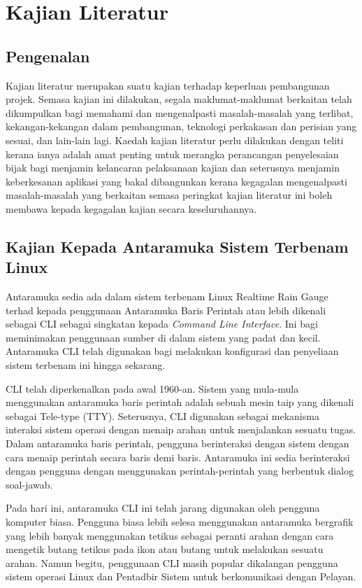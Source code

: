 \chapter{Kajian Literatur}\label{c2}%

\section{Pengenalan}
Kajian literatur merupakan suatu kajian terhadap keperluan pembangunan projek. Semasa kajian ini dilakukan, segala maklumat-maklumat berkaitan telah dikumpulkan bagi memahami dan mengenalpasti masalah-masalah yang terlibat, kekangan-kekangan dalam pembangunan, teknologi perkakasan dan perisian yang sesuai, dan lain-lain lagi. Kaedah kajian literatur perlu dilakukan dengan teliti kerana ianya adalah amat penting untuk merangka
perancangan penyelesaian bijak bagi menjamin kelancaran pelaksanaan kajian dan seterusnya menjamin keberkesanan aplikasi yang bakal dibangunkan kerana kegagalan mengenalpasti masalah-masalah yang berkaitan semasa peringkat kajian literatur ini boleh membawa kepada kegagalan kajian secara keseluruhannya.

\section{Kajian Kepada Antaramuka Sistem Terbenam Linux}
Antaramuka sedia ada dalam sistem terbenam Linux Realtime Rain Gauge terhad kepada penggunaan Antaramuka Baris Perintah atau lebih dikenali sebagai CLI sebagai singkatan kepada \textit{Command Line Interface}. Ini bagi meminimakan penggunaan sumber di dalam sistem yang padat dan kecil. Antaramuka CLI telah digunakan bagi melakukan konfigurasi dan penyeliaan sistem terbenam ini hingga sekarang.

CLI telah diperkenalkan pada awal 1960-an. Sistem yang mula-mula menggunakan antaramuka baris perintah adalah sebuah mesin taip yang dikenali sebagai Tele-type (TTY). Seterusnya, CLI digunakan sebagai mekanisma interaksi sistem operasi dengan menaip arahan untuk menjalankan sesuatu tugas. Dalam antaramuka baris perintah, pengguna berinteraksi dengan sistem dengan cara menaip perintah secara baris demi baris. Antaramuka ini sedia berinteraksi dengan pengguna dengan menggunakan perintah-perintah yang berbentuk dialog soal-jawab.

Pada hari ini, antaramuka CLI ini telah jarang digunakan oleh pengguna komputer biasa. Pengguna biasa lebih selesa menggunakan antaramuka bergrafik yang lebih banyak menggunakan tetikus sebagai peranti arahan dengan cara mengetik butang tetikus pada ikon atau butang untuk melakukan sesuatu arahan. Namun begitu, penggunaan CLI masih popular dikalangan pengguna sistem operasi Linux dan Pentadbir Sistem untuk berkomunikasi dengan Pelayan.

